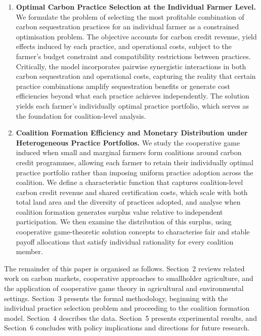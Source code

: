 \documentclass[manuscript, screen]{acmart}
\begin{document}
\begin{enumerate}
    \item \textbf{Optimal Carbon Practice Selection at the Individual Farmer Level.}
    We formulate the problem of selecting the most profitable combination of carbon sequestration practices for an individual farmer as a constrained optimisation problem. The objective accounts for carbon credit revenue, yield effects induced by each practice, and operational costs, subject to the farmer's budget constraint and compatibility restrictions between practices. Critically, the model incorporates pairwise synergistic interactions in both carbon sequestration and operational costs, capturing the reality that certain practice combinations amplify sequestration benefits or generate cost efficiencies beyond what each practice achieves independently. The solution yields each farmer's individually optimal practice portfolio, which serves as the foundation for coalition-level analysis.

    \item \textbf{Coalition Formation Efficiency and Monetary Distribution under Heterogeneous Practice Portfolios.}
    We study the cooperative game induced when small and marginal farmers form coalitions around carbon credit programmes, allowing each farmer to retain their individually optimal practice portfolio rather than imposing uniform practice adoption across the coalition. We define a characteristic function that captures coalition-level carbon credit revenue and shared certification costs, which scale with both total land area and the diversity of practices adopted, and analyse when coalition formation generates surplus value relative to independent participation. We then examine the distribution of this surplus, using cooperative game-theoretic solution concepts to characterise fair and stable payoff allocations that satisfy individual rationality for every coalition member. 
\end{enumerate}

The remainder of this paper is organised as follows. Section~2 reviews related work on carbon markets, cooperative approaches to smallholder agriculture, and the application of cooperative game theory in agricultural and environmental settings. Section~3 presents the formal methodology, beginning with the individual practice selection problem and proceeding to the coalition formation model. Section~4 describes the data. Section~5 presents experimental results, and Section~6 concludes with policy implications and directions for future research.
\end{document}

